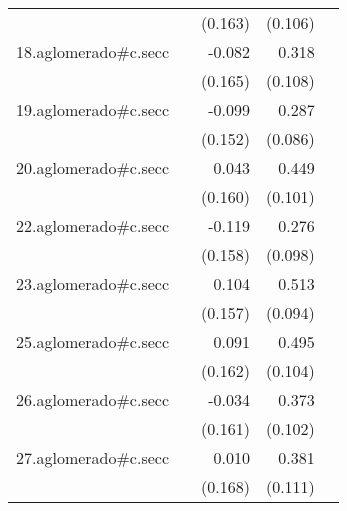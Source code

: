 {\begin{longtable}{l*{4}{D{.}{.}{-1}}}
            &                     &     (0.163)         &     (0.106)         &                     \\
\addlinespace
18.aglomerado#c.secc&                     &      -0.082         &       0.318\sym{**} &                     \\
            &                     &     (0.165)         &     (0.108)         &                     \\
\addlinespace
19.aglomerado#c.secc&                     &      -0.099         &       0.287\sym{***}&                     \\
            &                     &     (0.152)         &     (0.086)         &                     \\
\addlinespace
20.aglomerado#c.secc&                     &       0.043         &       0.449\sym{***}&                     \\
            &                     &     (0.160)         &     (0.101)         &                     \\
\addlinespace
22.aglomerado#c.secc&                     &      -0.119         &       0.276\sym{**} &                     \\
            &                     &     (0.158)         &     (0.098)         &                     \\
\addlinespace
23.aglomerado#c.secc&                     &       0.104         &       0.513\sym{***}&                     \\
            &                     &     (0.157)         &     (0.094)         &                     \\
\addlinespace
25.aglomerado#c.secc&                     &       0.091         &       0.495\sym{***}&                     \\
            &                     &     (0.162)         &     (0.104)         &                     \\
\addlinespace
26.aglomerado#c.secc&                     &      -0.034         &       0.373\sym{***}&                     \\
            &                     &     (0.161)         &     (0.102)         &                     \\
\addlinespace
27.aglomerado#c.secc&                     &       0.010         &       0.381\sym{***}&                     \\
            &                     &     (0.168)         &     (0.111)         &                     \\

\end{longtable}}
